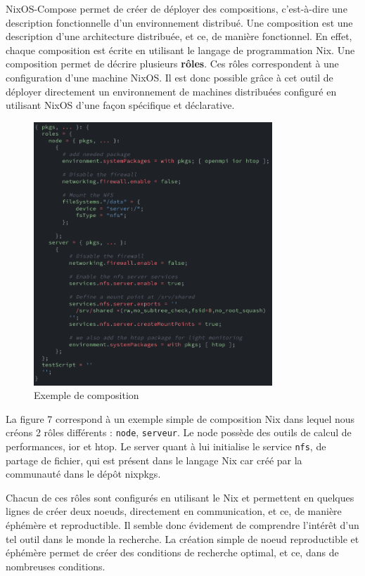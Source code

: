 \documentclass[a4paper,french,12pt, titlepage]{article}
\begin{document}
NixOS-Compose permet de créer de déployer des compositions, c'est-à-dire
une description fonctionnelle d'un environnement distribué. Une
composition est une description d'une architecture distribuée, et ce, de
manière fonctionnel. En effet, chaque composition est écrite en
utilisant le langage de programmation Nix. Une composition permet de
décrire plusieurs \textbf{rôles}. Ces rôles correspondent à une
configuration d'une machine NixOS. Il est donc possible grâce à cet
outil de déployer directement un environnement de machines distribuées
configuré en utilisant NixOS d'une façon spécifique et
déclarative.\newline

\begin{figure}[h]
\centering
\includegraphics[width=0.8\textwidth,height=0.8\textheight,keepaspectratio]{images/coposition-nfs.png}
\caption{Exemple de composition}
\end{figure}

La figure 7 correspond à un exemple simple de composition Nix dans
lequel nous créons 2 rôles différents : \texttt{node}, \texttt{serveur}.
Le node possède des outils de calcul de performances, ior et htop. Le
server quant à lui initialise le service \texttt{nfs}, de partage de
fichier, qui est présent dans le langage Nix car créé par la communauté
dans le dépôt nixpkgs.\newline

Chacun de ces rôles sont configurés en utilisant le Nix et permettent en
quelques lignes de créer deux noeuds, directement en communication, et
ce, de manière éphémère et reproductible. Il semble donc évidement de
comprendre l'intérêt d'un tel outil dans le monde la recherche. La
création simple de noeud reproductible et éphémère permet de créer des
conditions de recherche optimal, et ce, dans de nombreuses
conditions.\newline
\end{document}

